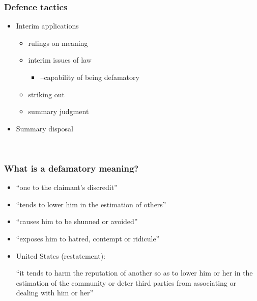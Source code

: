 \documentclass[ignorenonframetext,]{beamer}
\begin{document}
\begin{frame}
\frametitle{Defence tactics}

\begin{itemize}
\item  Interim applications

  \begin{itemize}
  \item    rulings on meaning
  \item    interim issues of law

    \begin{itemize}
    \item      {--}capability of being defamatory
    \end{itemize}
  \item    striking out
  \item    summary judgment
  \end{itemize}
\item  Summary disposal
\end{itemize}

~


\end{frame}

\begin{frame}
\frametitle{What is a defamatory meaning?}

\begin{itemize}
\item  ``one to the claimant's discredit''
\item  ``tends to lower him in the estimation of others''
\item  ``causes him to be shunned or avoided''
\item  ``exposes him to hatred, contempt or ridicule''
\item  United States (restatement):

  {}``it tends to harm the reputation of another so as to lower him or
  her in the estimation of the community or deter third parties from
  associating or dealing with him or her''
\end{itemize}

~


\end{frame}
\end{document}
